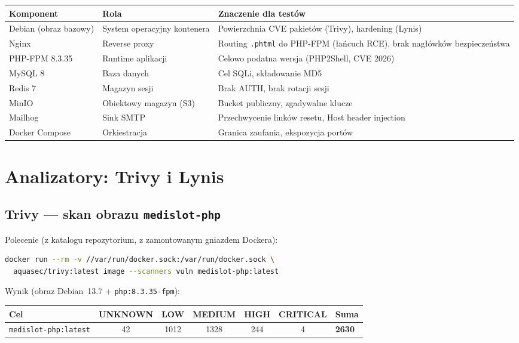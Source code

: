 \documentclass[11pt,a4paper]{article}
\begin{document}
\begin{center}
\begin{tabularx}{\textwidth}{@{}l l L@{}}
\toprule
\textbf{Komponent} & \textbf{Rola} & \textbf{Znaczenie dla testów} \\
\midrule
Debian (obraz bazowy) & System operacyjny kontenera & Powierzchnia CVE pakietów (Trivy), hardening (Lynis) \\
Nginx & Reverse proxy & Routing \texttt{.phtml} do PHP-FPM (łańcuch RCE), brak nagłówków bezpieczeństwa \\
PHP-FPM 8.3.35 & Runtime aplikacji & Celowo podatna wersja (PHP2Shell, CVE 2026) \\
MySQL 8 & Baza danych & Cel SQLi, składowanie MD5 \\
Redis 7 & Magazyn sesji & Brak AUTH, brak rotacji sesji \\
MinIO & Obiektowy magazyn (S3) & Bucket publiczny, zgadywalne klucze \\
Mailhog & Sink SMTP & Przechwycenie linków resetu, Host header injection \\
Docker Compose & Orkiestracja & Granica zaufania, ekspozycja portów \\
\bottomrule
\end{tabularx}
\end{center}

\section{Analizatory: Trivy i Lynis}
\label{sec:scanners}

\subsection{Trivy --- skan obrazu \texttt{medislot-php}}
Polecenie (z katalogu repozytorium, z zamontowanym gniazdem Dockera):
\begin{lstlisting}[language=bash]
docker run --rm -v //var/run/docker.sock:/var/run/docker.sock \
  aquasec/trivy:latest image --scanners vuln medislot-php:latest
\end{lstlisting}

\noindent Wynik (obraz Debian~13.7 + \texttt{php:8.3.35-fpm}):

\begin{center}
\begin{tabularx}{\textwidth}{@{}l c c c c c L@{}}
\toprule
\textbf{Cel} & \textbf{UNKNOWN} & \textbf{LOW} & \textbf{MEDIUM} & \textbf{HIGH} & \textbf{CRITICAL} & \textbf{Suma} \\
\midrule
\texttt{medislot-php:latest} & 42 & 1012 & 1328 & 244 & 4 & \textbf{2630} \\
\bottomrule
\end{tabularx}
\end{center}
\end{document}
